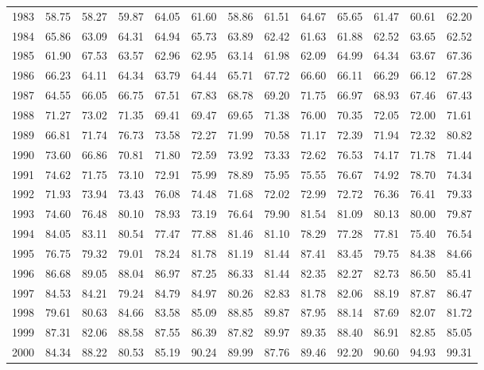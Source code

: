 \begin{longtable}{rrrrrrrrrrrrr}
  1983 & 58.75 & 58.27 & 59.87 & 64.05 & 61.60 & 58.86 & 61.51 & 64.67 & 65.65 & 61.47 & 60.61 & 62.20 \\ 
  1984 & 65.86 & 63.09 & 64.31 & 64.94 & 65.73 & 63.89 & 62.42 & 61.63 & 61.88 & 62.52 & 63.65 & 62.52 \\ 
  1985 & 61.90 & 67.53 & 63.57 & 62.96 & 62.95 & 63.14 & 61.98 & 62.09 & 64.99 & 64.34 & 63.67 & 67.36 \\ 
  1986 & 66.23 & 64.11 & 64.34 & 63.79 & 64.44 & 65.71 & 67.72 & 66.60 & 66.11 & 66.29 & 66.12 & 67.28 \\ 
  1987 & 64.55 & 66.05 & 66.75 & 67.51 & 67.83 & 68.78 & 69.20 & 71.75 & 66.97 & 68.93 & 67.46 & 67.43 \\ 
  1988 & 71.27 & 73.02 & 71.35 & 69.41 & 69.47 & 69.65 & 71.38 & 76.00 & 70.35 & 72.05 & 72.00 & 71.61 \\ 
  1989 & 66.81 & 71.74 & 76.73 & 73.58 & 72.27 & 71.99 & 70.58 & 71.17 & 72.39 & 71.94 & 72.32 & 80.82 \\ 
  1990 & 73.60 & 66.86 & 70.81 & 71.80 & 72.59 & 73.92 & 73.33 & 72.62 & 76.53 & 74.17 & 71.78 & 71.44 \\ 
  1991 & 74.62 & 71.75 & 73.10 & 72.91 & 75.99 & 78.89 & 75.95 & 75.55 & 76.67 & 74.92 & 78.70 & 74.34 \\ 
  1992 & 71.93 & 73.94 & 73.43 & 76.08 & 74.48 & 71.68 & 72.02 & 72.99 & 72.72 & 76.36 & 76.41 & 79.33 \\ 
  1993 & 74.60 & 76.48 & 80.10 & 78.93 & 73.19 & 76.64 & 79.90 & 81.54 & 81.09 & 80.13 & 80.00 & 79.87 \\ 
  1994 & 84.05 & 83.11 & 80.54 & 77.47 & 77.88 & 81.46 & 81.10 & 78.29 & 77.28 & 77.81 & 75.40 & 76.54 \\ 
  1995 & 76.75 & 79.32 & 79.01 & 78.24 & 81.78 & 81.19 & 81.44 & 87.41 & 83.45 & 79.75 & 84.38 & 84.66 \\ 
  1996 & 86.68 & 89.05 & 88.04 & 86.97 & 87.25 & 86.33 & 81.44 & 82.35 & 82.27 & 82.73 & 86.50 & 85.41 \\ 
  1997 & 84.53 & 84.21 & 79.24 & 84.79 & 84.97 & 80.26 & 82.83 & 81.78 & 82.06 & 88.19 & 87.87 & 86.47 \\ 
  1998 & 79.61 & 80.63 & 84.66 & 83.58 & 85.09 & 88.85 & 89.87 & 87.95 & 88.14 & 87.69 & 82.07 & 81.72 \\ 
  1999 & 87.31 & 82.06 & 88.58 & 87.55 & 86.39 & 87.82 & 89.97 & 89.35 & 88.40 & 86.91 & 82.85 & 85.05 \\ 
  2000 & 84.34 & 88.22 & 80.53 & 85.19 & 90.24 & 89.99 & 87.76 & 89.46 & 92.20 & 90.60 & 94.93 & 99.31 \\ 

\end{longtable}
